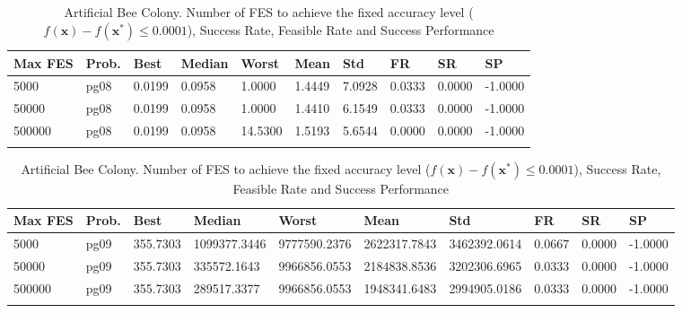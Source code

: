 \documentclass[10pt, a4paper]{book}
\begin{document}
\begin{center}
\begin{longtable}{l l l l l l l l l l}
\textbf{Max FES} & \textbf{Prob.} & \textbf{Best} & \textbf{Median} & \textbf{Worst} & \textbf{Mean} & \textbf{Std} & \textbf{FR} & \textbf{SR} & \textbf{SP} \\
\hline
5000 & pg08 & 0.0199 & 0.0958 & 1.0000 & 1.4449 & 7.0928 & 0.0333 & 0.0000 & -1.0000 \\
50000 & pg08 & 0.0199 & 0.0958 & 1.0000 & 1.4410 & 6.1549 & 0.0333 & 0.0000 & -1.0000 \\
500000 & pg08 & 0.0199 & 0.0958 & 14.5300 & 1.5193 & 5.6544 & 0.0000 & 0.0000 & -1.0000 \\

\caption{ Artificial Bee Colony. Number of FES to achieve the fixed accuracy level ($f(\mathbf{x}) - f(\mathbf{x}^{*}) \leq 0.0001$), Success Rate, Feasible Rate and Success Performance }
\end{longtable}
\end{center}

\begin{center}
\begin{longtable}{l l l l l l l l l l}
\textbf{Max FES} & \textbf{Prob.} & \textbf{Best} & \textbf{Median} & \textbf{Worst} & \textbf{Mean} & \textbf{Std} & \textbf{FR} & \textbf{SR} & \textbf{SP} \\
\hline
5000 & pg09 & 355.7303 & 1099377.3446 & 9777590.2376 & 2622317.7843 & 3462392.0614 & 0.0667 & 0.0000 & -1.0000 \\
50000 & pg09 & 355.7303 & 335572.1643 & 9966856.0553 & 2184838.8536 & 3202306.6965 & 0.0333 & 0.0000 & -1.0000 \\
500000 & pg09 & 355.7303 & 289517.3377 & 9966856.0553 & 1948341.6483 & 2994905.0186 & 0.0333 & 0.0000 & -1.0000 \\

\caption{ Artificial Bee Colony. Number of FES to achieve the fixed accuracy level ($f(\mathbf{x}) - f(\mathbf{x}^{*}) \leq 0.0001$), Success Rate, Feasible Rate and Success Performance }
\end{longtable}
\end{center}
\end{document}
